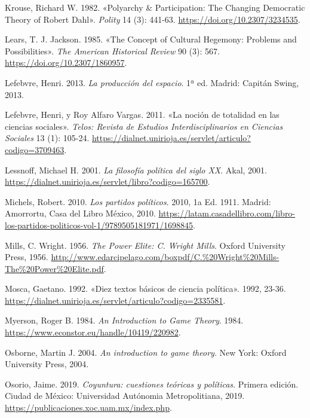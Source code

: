 \documentclass[
  letterpaper,
  DIV=11,
  numbers=noendperiod]{scrreprt}
\newlength{\cslhangindent}
\newenvironment{CSLReferences}[2] %
 {\begin{list}{}{%
  \setlength{\itemindent}{0pt}
  \setlength{\leftmargin}{0pt}
  \setlength{\parsep}{0pt}
  \ifodd #1
   \setlength{\leftmargin}{\cslhangindent}
   \setlength{\itemindent}{-1\cslhangindent}
  \fi
  \setlength{\itemsep}{#2\baselineskip}}}
 {\end{list}}
\begin{document}
\begin{CSLReferences}{1}{1}
Krouse, Richard W. 1982. {«Polyarchy \& Participation: The Changing
Democratic Theory of Robert Dahl»}. \emph{Polity} 14 (3): 441-63.
\url{https://doi.org/10.2307/3234535}.

Lears, T. J. Jackson. 1985. {«The Concept of Cultural Hegemony: Problems
and Possibilities»}. \emph{The American Historical Review} 90 (3): 567.
\url{https://doi.org/10.2307/1860957}.

Lefebvre, Henri. 2013. \emph{La producción del espacio}. 1ª ed. Madrid:
Capitán Swing, 2013.

Lefebvre, Henri, y Roy Alfaro Vargas. 2011. {«La noción de totalidad en
las ciencias sociales»}. \emph{Telos: Revista de Estudios
Interdisciplinarios en Ciencias Sociales} 13 (1): 105-24.
\url{https://dialnet.unirioja.es/servlet/articulo?codigo=3709463}.

Lessnoff, Michael H. 2001. \emph{La filosofía política del siglo XX}.
Akal, 2001.
\url{https://dialnet.unirioja.es/servlet/libro?codigo=165700}.

Michels, Robert. 2010. \emph{Los partidos políticos}. 2010, 1a Ed. 1911.
Madrid: Amorrortu, Casa del Libro México, 2010.
\url{https://latam.casadellibro.com/libro-los-partidos-politicos-vol-1/9789505181971/1698845}.

Mills, C. Wright. 1956. \emph{The Power Elite: C. Wright Mills}. Oxford
University Press, 1956.
\url{http://www.edarcipelago.com/boxpdf/C.\%20Wright\%20Mills-The\%20Power\%20Elite.pdf}.

Mosca, Gaetano. 1992. {«Diez textos básicos de ciencia política»}. 1992,
23-36.
\url{https://dialnet.unirioja.es/servlet/articulo?codigo=2335581}.

Myerson, Roger B. 1984. \emph{An Introduction to Game Theory}. 1984.
\url{https://www.econstor.eu/handle/10419/220982}.

Osborne, Martin J. 2004. \emph{An introduction to game theory}. New
York: Oxford University Press, 2004.

Osorio, Jaime. 2019. \emph{Coyuntura: cuestiones teóricas y políticas}.
Primera edición. Ciudad de México: Universidad Autónomia Metropolitiana,
2019. \url{https://publicaciones.xoc.uam.mx/index.php}.


\end{CSLReferences}
\end{document}
